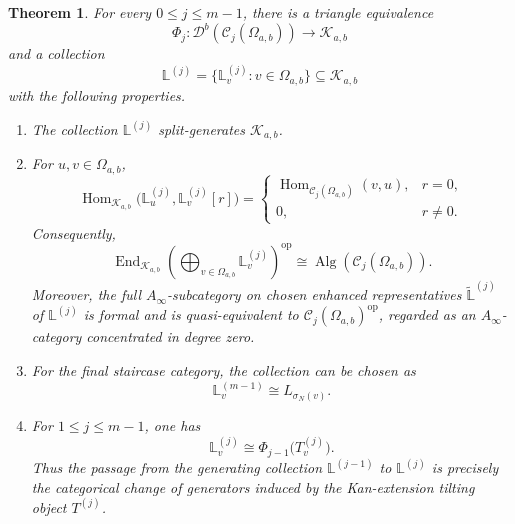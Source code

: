 \documentclass[12pt,a4paper,english,reqno]{amsart}
\theoremstyle{plain}
\newtheorem{theorem}{Theorem}[section]
\theoremstyle{definition}
\newcommand{\Hom}{\operatorname{Hom}}
\newcommand{\End}{\operatorname{End}}
\newcommand{\op}{\mathrm{op}}
\newcommand{\C}{\mathcal C}
\newcommand{\Db}[1]{{\mathscr D}^b(#1)}
\begin{document}
\begin{theorem}
\label{thm:categorical-fukaya-staircase}
For every $0\leq j\leq m-1$, there is a triangle equivalence
\begin{equation}
 \Phi_j\colon
 \Db{\C_j(\Omega_{a,b})}
 \longrightarrow
 \mathcal K_{a,b}
\label{eq:Phi-j}
\end{equation}
and a collection
\begin{equation}
 \mathbb L^{(j)}
 =
 \{\mathbb L_v^{(j)}:v\in\Omega_{a,b}\}
 \subseteq\mathcal K_{a,b}
\label{eq:L-j-collection}
\end{equation}
with the following properties.
\begin{enumerate}
\item The collection $\mathbb L^{(j)}$ split-generates
$\mathcal K_{a,b}$.
\item For $u,v\in\Omega_{a,b}$,
\begin{equation}
 \Hom_{\mathcal K_{a,b}}
 \bigl(\mathbb L_u^{(j)},\mathbb L_v^{(j)}[r]\bigr)
 =
 \begin{cases}
  \Hom_{\C_j(\Omega_{a,b})}(v,u),&r=0,\\
  0,&r\neq0.
 \end{cases}
\label{eq:L-j-Hom}
\end{equation}
Consequently,
\begin{equation}
 \End_{\mathcal K_{a,b}}
 \left(
  \bigoplus_{v\in\Omega_{a,b}}\mathbb L_v^{(j)}
 \right)^{\op}
 \cong
 \operatorname{Alg}\!\left(\C_j(\Omega_{a,b})\right).
\label{eq:L-j-end}
\end{equation}
Moreover, the full $A_\infty$-subcategory on chosen enhanced representatives
$\widetilde{\mathbb L}^{(j)}$ of $\mathbb L^{(j)}$ is formal and is
quasi-equivalent to
$\C_j(\Omega_{a,b})^{\op}$, regarded as an $A_\infty$-category
concentrated in degree zero.
\item For the final staircase category, the collection can be chosen as
\begin{equation}
 \mathbb L_v^{(m-1)}
 \cong
 L_{\sigma_N(v)}.
\label{eq:final-product-lagrangian}
\end{equation}
\item For $1\leq j\leq m-1$, one has
\begin{equation}
 \mathbb L_v^{(j)}
 \cong
 \Phi_{j-1}\bigl(T_v^{(j)}\bigr).
\label{eq:Kan-Fukaya-image}
\end{equation}
Thus the passage from the generating collection
$\mathbb L^{(j-1)}$ to $\mathbb L^{(j)}$ is precisely the
categorical change of generators induced by the Kan-extension tilting
object $T^{(j)}$.
\end{enumerate}
\end{theorem}
\end{document}
